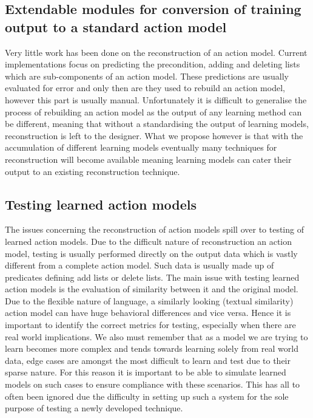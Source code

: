 \subsection{Extendable modules for conversion of training output to a standard action model}
Very little work has been done on the reconstruction of an action model. Current implementations focus on predicting the precondition, adding and deleting lists which are sub-components of an action model. These predictions are usually evaluated for error and only then are they used to rebuild an action model, however this part is usually manual. Unfortunately it is difficult to generalise the process of rebuilding an action model as the output of any learning method can be different, meaning that without a standardising the output of learning models, reconstruction is left to the designer. What we propose however is that with the accumulation of different learning models eventually many techniques for reconstruction will become available meaning learning models can cater their output to an existing reconstruction technique.

\subsection{Testing learned action models}
The issues concerning the reconstruction of action models spill over to testing of learned action models. Due to the difficult nature of reconstruction an action model, testing is usually performed directly on the output data which is vastly different from a complete action model. Such data is usually made up of predicates defining add lists or delete lists. The main issue with testing learned action models is the evaluation of similarity between it and the original model. Due to the flexible nature of language, a similarly looking (textual similarity) action model can have huge behavioral differences and vice versa. Hence it is important to identify the correct metrics for testing, especially when there are real world implications. We also must remember that as a model we are trying to learn becomes more complex and tends towards learning solely from real world data, edge cases are amongst the most difficult to learn and test due to their sparse nature. For this reason it is important to be able to simulate learned models on such cases to ensure compliance with these scenarios. This has all to often been ignored due the difficulty in setting up such a system for the sole purpose of testing a newly developed technique.